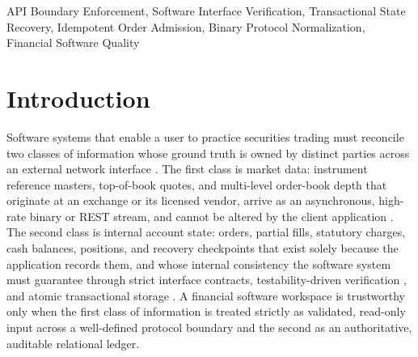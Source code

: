 \documentclass[journal,onecolumn,10pt]{IEEEtran}
\begin{document}
\begin{IEEEkeywords}
API Boundary Enforcement, Software Interface Verification, Transactional State Recovery, Idempotent Order Admission, Binary Protocol Normalization, Financial Software Quality
\end{IEEEkeywords}

\section{Introduction}

Software systems that enable a user to practice securities trading must reconcile two classes of information whose ground truth is owned by distinct parties across an external network interface \cite{gonzalezmora2023,rath2023,fresnoaranda2024}. The first class is market data: instrument reference masters, top-of-book quotes, and multi-level order-book depth that originate at an exchange or its licensed vendor, arrive as an asynchronous, high-rate binary or REST stream, and cannot be altered by the client application \cite{harris2003,hasbrouck2007,gould2013}. The second class is internal account state: orders, partial fills, statutory charges, cash balances, positions, and recovery checkpoints that exist solely because the application records them, and whose internal consistency the software system must guarantee through strict interface contracts, testability-driven verification \cite{parsa2025}, and atomic transactional storage \cite{gray1993,kleppmann2017}. A financial software workspace is trustworthy only when the first class of information is treated strictly as validated, read-only input across a well-defined protocol boundary and the second as an authoritative, auditable relational ledger.
\end{document}
